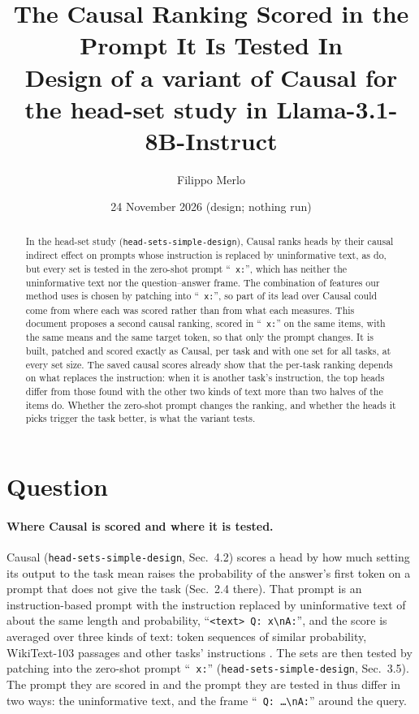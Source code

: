 \documentclass[10pt,a4paper]{article}
\title{The Causal Ranking Scored in the Prompt It Is Tested In\\[2pt]
\large Design of a variant of Causal for the head-set study in Llama-3.1-8B-Instruct}
\author{Filippo Merlo}
\date{24 November 2026 (design; nothing run)}
\newcommand{\nl}{\textbackslash n}
\newcommand{\p}[1]{``\texttt{#1}''}
\newcommand{\simpledoc}{\texttt{head-sets-simple-design}}
\begin{document}
\maketitle

\begin{abstract}
In the head-set study (\simpledoc), Causal ranks heads by their causal indirect effect on prompts whose instruction is replaced by uninformative text, as \citet{davidson2025different} do, but every set is tested in the zero-shot prompt \p{ x:}, which has neither the uninformative text nor the question--answer frame. The combination of features our method uses is chosen by patching into \p{ x:}, so part of its lead over Causal could come from where each was scored rather than from what each measures. This document proposes a second causal ranking, scored in \p{ x:} on the same items, with the same means and the same target token, so that only the prompt changes. It is built, patched and scored exactly as Causal, per task and with one set for all tasks, at every set size. The saved causal scores already show that the per-task ranking depends on what replaces the instruction: when it is another task's instruction, the top heads differ from those found with the other two kinds of text more than two halves of the items do. Whether the zero-shot prompt changes the ranking, and whether the heads it picks trigger the task better, is what the variant tests.
\end{abstract}

\section{Question}\label{sec:question}

\paragraph{Where Causal is scored and where it is tested.} Causal (\simpledoc, Sec.~4.2) scores a head by how much setting its output to the task mean raises the probability of the answer's first token on a prompt that does not give the task (Sec.~2.4 there). That prompt is an instruction-based prompt with the instruction replaced by uninformative text of about the same length and probability, \p{<text> Q: x\nl A:}, and the score is averaged over three kinds of text: token sequences of similar probability, WikiText-103 passages and other tasks' instructions \citep[Sec.~2.1]{davidson2025different}. The sets are then tested by patching into the zero-shot prompt \p{ x:} (\simpledoc, Sec.~3.5). The prompt they are scored in and the prompt they are tested in thus differ in two ways: the uninformative text, and the frame \p{ Q: \dots\nl A:} around the query.
\end{document}
